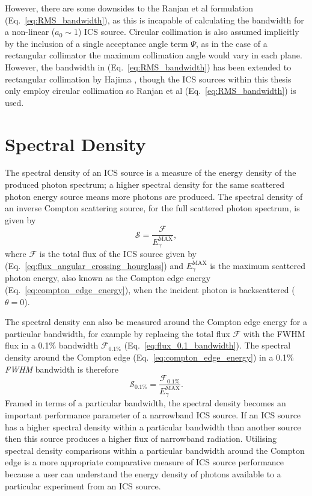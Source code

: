 \documentclass[../main.tex]{subfiles}
\begin{document}
However, there are some downsides to the Ranjan et al formulation (Eq.~\ref{eq:RMS_bandwidth}), as this is incapable of calculating the bandwidth for a non-linear ($a_{0}\sim 1$) ICS source. Circular collimation is also assumed implicitly by the inclusion of a single acceptance angle term $\Psi$, as in the case of a rectangular collimator the maximum collimation angle would vary in each plane. However, the bandwidth in (Eq.~\ref{eq:RMS_bandwidth}) has been extended to rectangular collimation by Hajima \cite{hajima2021bandwidth}, though the ICS sources within this thesis only employ circular collimation so Ranjan et al \cite{ranjan2018simulation} (Eq.~\ref{eq:RMS_bandwidth}) is used. 

\section{Spectral Density}

The spectral density of an ICS source is a measure of the energy density of the produced photon spectrum; a higher spectral density for the same scattered photon energy source means more photons are produced. The spectral density of an inverse Compton scattering source, for the full scattered photon spectrum, is given by
\begin{equation}
\mathcal{S} = \frac{\mathcal{F}}{E_{\gamma}^{\mathrm{MAX}}},
\label{eq:spectral_density}    
\end{equation}
where $\mathcal{F}$ is the total flux of the ICS source given by (Eq.~\ref{eq:flux_angular_crossing_hourglass}) and $E_{\gamma}^{\mathrm{MAX}}$ is the maximum scattered photon energy, also known as the Compton edge energy (Eq.~\ref{eq:compton_edge_energy}), when the incident photon is backscattered ($\theta=0$).

The spectral density can also be measured around the Compton edge energy for a particular bandwidth, for example by replacing the total flux $\mathcal{F}$ with the FWHM flux in a 0.1\% bandwidth $\mathcal{F_{\mathrm{0.1\%}}}$ (Eq.~\ref{eq:flux_0.1_bandwidth}). The spectral density around the Compton edge (Eq.~\ref{eq:compton_edge_energy}) in a 0.1\% \textit{FWHM} bandwidth is therefore
\begin{equation}
\mathcal{S}_{\mathrm{0.1\%}} = \frac{\mathcal{F_{\mathrm{0.1\%}}}}{E_{\gamma}^{\mathrm{MAX}}}.
\label{eq:spectral_density_0.1}    
\end{equation}
Framed in terms of a particular bandwidth, the spectral density becomes an important performance parameter of a narrowband ICS source. If an ICS source has a higher spectral density within a particular bandwidth than another source then this source produces a higher flux of narrowband radiation. Utilising spectral density comparisons within a particular bandwidth around the Compton edge is a more appropriate comparative measure of ICS source performance because a user can understand the energy density of photons available to a particular experiment from an ICS source.   
\end{document}
